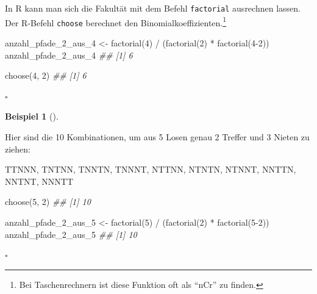 \documentclass[
  ngerman,
  letterpaper,
  twoside,
  open=any]{scrbook}
\newenvironment{Shaded}{\begin{snugshade}}{\end{snugshade}}
\newcommand{\DecValTok}[1]{\textcolor[rgb]{0.68,0.00,0.00}{#1}}
\newcommand{\DocumentationTok}[1]{\textcolor[rgb]{0.37,0.37,0.37}{\textit{#1}}}
\newcommand{\FunctionTok}[1]{\textcolor[rgb]{0.28,0.35,0.67}{#1}}
\newcommand{\NormalTok}[1]{\textcolor[rgb]{0.00,0.23,0.31}{#1}}
\newcommand{\OtherTok}[1]{\textcolor[rgb]{0.00,0.23,0.31}{#1}}
\newcommand{\SpecialCharTok}[1]{\textcolor[rgb]{0.37,0.37,0.37}{#1}}
\theoremstyle{definition}
\newtheorem{example}{Beispiel}[chapter]
\theoremstyle{plain}
\theoremstyle{definition}
\theoremstyle{definition}
\theoremstyle{definition}
\newtheorem{example}{Beispiel}[chapter]
\theoremstyle{definition}
\theoremstyle{remark}
\begin{document}
In R kann man sich die Fakultät mit dem Befehl \texttt{factorial}
ausrechnen lassen. Der R-Befehl \texttt{choose} berechnet den
Binomialkoeffizienten.\footnote{Bei Taschenrechnern ist diese Funktion
  oft als \enquote{nCr} zu finden.}

\begin{Shaded}
\begin{Highlighting}[]
\NormalTok{anzahl\_pfade\_2\_aus\_4 }\OtherTok{\textless{}{-}} 
  \FunctionTok{factorial}\NormalTok{(}\DecValTok{4}\NormalTok{) }\SpecialCharTok{/}\NormalTok{ (}\FunctionTok{factorial}\NormalTok{(}\DecValTok{2}\NormalTok{) }\SpecialCharTok{*} \FunctionTok{factorial}\NormalTok{(}\DecValTok{4{-}2}\NormalTok{))}
\NormalTok{anzahl\_pfade\_2\_aus\_4}
\DocumentationTok{\#\# [1] 6}

\FunctionTok{choose}\NormalTok{(}\DecValTok{4}\NormalTok{, }\DecValTok{2}\NormalTok{)}
\DocumentationTok{\#\# [1] 6}
\end{Highlighting}
\end{Shaded}

\(\square\)

\begin{example}[]\protect\hypertarget{exm-2aus5}{}\label{exm-2aus5}

Hier sind die 10 Kombinationen, um aus 5 Losen genau 2 Treffer und 3
Nieten zu ziehen:

TTNNN, TNTNN, TNNTN, TNNNT, NTTNN, NTNTN, NTNNT, NNTTN, NNTNT, NNNTT

\begin{Shaded}
\begin{Highlighting}[]
\FunctionTok{choose}\NormalTok{(}\DecValTok{5}\NormalTok{, }\DecValTok{2}\NormalTok{)}
\DocumentationTok{\#\# [1] 10}

\NormalTok{anzahl\_pfade\_2\_aus\_5 }\OtherTok{\textless{}{-}} 
  \FunctionTok{factorial}\NormalTok{(}\DecValTok{5}\NormalTok{) }\SpecialCharTok{/}\NormalTok{ (}\FunctionTok{factorial}\NormalTok{(}\DecValTok{2}\NormalTok{) }\SpecialCharTok{*} \FunctionTok{factorial}\NormalTok{(}\DecValTok{5{-}2}\NormalTok{))}
\NormalTok{anzahl\_pfade\_2\_aus\_5}
\DocumentationTok{\#\# [1] 10}
\end{Highlighting}
\end{Shaded}

\(\square\)

\end{example}
\end{document}
